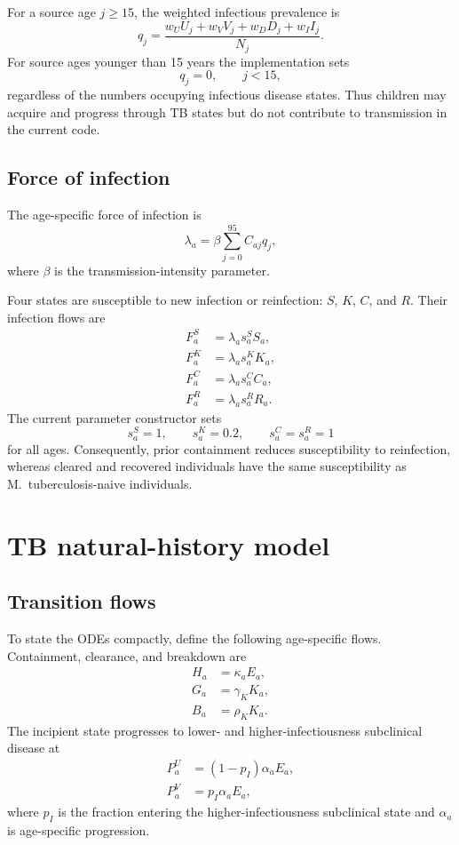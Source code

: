 \documentclass[11pt]{article}
\begin{document}
For a source age $j\ge 15$, the weighted infectious prevalence is
\begin{equation}
q_j=\frac{w_UU_j+w_VV_j+w_DD_j+w_II_j}{N_j}.
\label{eq:q}
\end{equation}
For source ages younger than 15 years the implementation sets
\begin{equation}
q_j=0,\qquad j<15,
\label{eq:childsource}
\end{equation}
regardless of the numbers occupying infectious disease states. Thus children may acquire and progress through TB states but do not contribute to transmission in the current code.

\subsection{Force of infection}

The age-specific force of infection is
\begin{equation}
\lambda_a=\beta\sum_{j=0}^{95}C_{aj}q_j,
\label{eq:foi}
\end{equation}
where $\beta$ is the transmission-intensity parameter.

Four states are susceptible to new infection or reinfection: $S$, $K$, $C$, and $R$. Their infection flows are
\begin{align}
F^S_a &= \lambda_a s^S_a S_a,\\
F^K_a &= \lambda_a s^K_a K_a,\\
F^C_a &= \lambda_a s^C_a C_a,\\
F^R_a &= \lambda_a s^R_a R_a.
\end{align}
The current parameter constructor sets
\begin{equation}
s^S_a=1,\qquad s^K_a=0.2,\qquad s^C_a=s^R_a=1
\end{equation}
for all ages. Consequently, prior containment reduces susceptibility to reinfection, whereas cleared and recovered individuals have the same susceptibility as M.~tuberculosis-naive individuals.

\section{TB natural-history model}

\subsection{Transition flows}

To state the ODEs compactly, define the following age-specific flows. Containment, clearance, and breakdown are
\begin{align}
H_a &= \kappa_aE_a,\\
G_a &= \gamma_KK_a,\\
B_a &= \rho_KK_a.
\end{align}
The incipient state progresses to lower- and higher-infectiousness subclinical disease at
\begin{align}
P^U_a &=(1-p_I)\alpha_aE_a,\\
P^V_a &=p_I\alpha_aE_a,
\end{align}
where $p_I$ is the fraction entering the higher-infectiousness subclinical state and $\alpha_a$ is age-specific progression.
\end{document}
